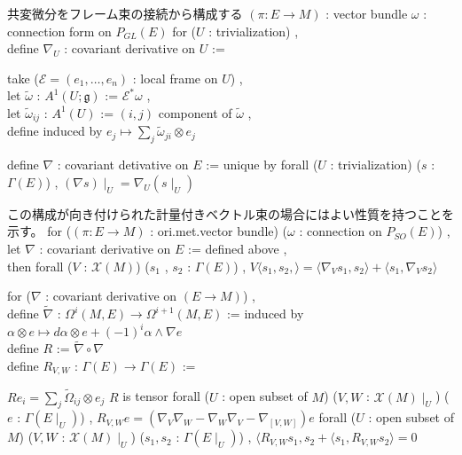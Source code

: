 \begin{Definition}
\itemnote
  共変微分をフレーム束の接続から構成する
\itemwhen \((\pi : E \to M)\) : vector bundle
\itemwhen \(\omega\) : connection form on \(P_{GL}(E)\)
\itemdefi
  for (\(U\) : trivialization) ,\\
  define \(\nabla_U\) : covariant derivative on \(U\) :=
  \begin{indentblock}
    take (\(\mathcal{E} = (e_1 , \ldots , e_n)\) : local frame on \(U\)) ,\\
    let \(\tilde{\omega}\) : \(A^1(U ; \mathfrak{g})\) := \(\mathcal{E}^*\omega\) ,\\
    let \(\tilde{\omega}_{ij}\) : \(A^1(U)\) := \((i,j)\) component of \(\tilde{\omega}\) ,\\
    define induced by \(e_j \mapsto \sum_j \tilde{\omega}_{ji} \otimes e_j\)
  \end{indentblock}
\itemdefi
  define \(\nabla\) : covariant detivative on \(E\) := unique by forall (\(U\) : trivialization) (\(s\) : \(\Gamma(E)\)) , \((\nabla s) \mid_{U} = \nabla_U (s \mid_U)\)
\end{Definition}

\begin{Theorem}
\itemprop
\end{Theorem}

\begin{Theorem}
\itemnote
  この構成が向き付けられた計量付きベクトル束の場合にはよい性質を持つことを示す。
\itemprop
  for (\((\pi : E \to M)\) : ori.met.vector bundle) (\(\omega\) : connection on \(P_{SO}(E)\)) ,\\
  let \(\nabla\) : covariant derivative on \(E\) := defined above ,\\
  then forall (\(V\) : \(\mathcal{X}(M)\)) (\(s_1\) , \(s_2\) : \(\Gamma(E)\)) , \(V \langle s_1 , s_2 , \rangle = \langle \nabla_V s_1 , s_2 \rangle + \langle s_1 , \nabla_V s_2 \rangle\)
\end{Theorem}

\begin{Definition}
\itemdefi
  for (\(\nabla\) : covariant derivative on \((E \to M)\)) ,\\
  define \(\tilde{\nabla}\) : \(\Omega^i(M , E) \to \Omega^{i + 1}(M , E)\) := induced by \(\alpha \otimes e \mapsto d \alpha \otimes e + (-1)^i \alpha \wedge \nabla e\) \\
  define \(R\) := \(\tilde{\nabla} \circ \nabla\) \\
  define \(R_{V , W}\) : \(\Gamma(E) \to \Gamma(E)\) := \(\)
\end{Definition}

\begin{Theorem}
\itemprop
  \(R e_i = \sum_j \tilde{\Omega}_{ij} \otimes e_j\)
\itemprop
  \(R\) is tensor
\itemprop
  forall (\(U\) : open subset of \(M\)) (\(V , W\) : \(\mathcal{X}(M) \mid_{U}\)) (\(e\) : \(\Gamma(E \mid_{U})\)) , \(R_{V , W}e = (\nabla_V \nabla_W - \nabla_W \nabla_V - \nabla_{[V , W]}) e\)
\itemprop
  forall (\(U\) : open subset of \(M\)) (\(V , W\) : \(\mathcal{X}(M) \mid_{U}\)) (\(s_1 , s_2\) : \(\Gamma(E \mid_{U})\)) , \(\langle R_{V, W} s_1 , s_2 + \langle s_1 , R_{V, W} s_2 \rangle = 0\)
\end{Theorem}
